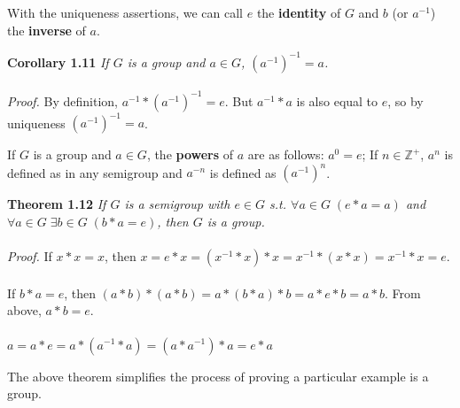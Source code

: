 \documentclass{article}
\begin{document}
With the uniqueness assertions, we can call \(e\) the \textbf{identity} of \(G\) and \(b\) (or \(a^{-1}\)) the \textbf{inverse} of \(a\).\\
\begin{greenrules}\color{OliveGreen}
    \textbf{Corollary 1.11} \textit{If \(G\) is a group and \(a\in G\), \((a^{-1})^{-1}=a\).}\\\\\color{black}
    \textit{Proof.} By definition, \(a^{-1}*(a^{-1})^{-1}=e\). But \(a^{-1}*a\) is also equal to \(e\), so by uniqueness \((a^{-1})^{-1}=a\).
\end{greenrules}
If \(G\) is a group and \(a\in G\), the \textbf{powers} of \(a\) are as follows: \(a^{0}=e\); If \(n\in\mathbb{Z}^{+}\), \(a^{n}\) is defined as in any semigroup and \(a^{-n}\) is defined as \((a^{-1})^{n}\).\\
\begin{redrules}\color{red}
\textbf{Theorem 1.12} \textit{If \(G\) is a semigroup with \(e\in G\) s.t. \(\forall a\in G\;(e*a=a)\) and \(\forall a\in G\;\exists b\in G\;(b*a=e)\), then \(G\) is a group.}\\\\\color{black}
\textit{Proof.} If \(x*x=x\), then \(x=e*x=(x^{-1}*x)*x=x^{-1}*(x*x)=x^{-1}*x=e\).\\\\ 
If \(b*a=e\), then \((a*b)*(a*b)=a*(b*a)*b=a*e*b=a*b\). From above, \(a*b=e\).\\\\
\(a=a*e=a*(a^{-1}*a)=(a*a^{-1})*a=e*a\)
\end{redrules}
The above theorem simplifies the process of proving a particular example is a group.\\
\end{document}
